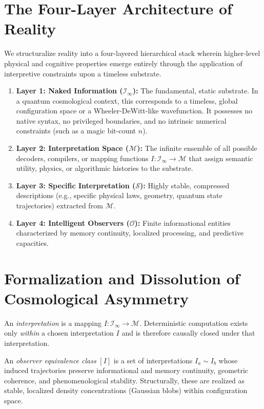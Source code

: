 \documentclass[11pt]{article}
\begin{document}
\section{The Four-Layer Architecture of Reality}
We structuralize reality into a four-layered hierarchical stack wherein higher-level physical and cognitive properties emerge entirely through the application of interpretive constraints upon a timeless substrate.

\begin{enumerate}
    \item \textbf{Layer 1: Naked Information ($\mathcal{I}_\infty$):} The fundamental, static substrate. In a quantum cosmological context, this corresponds to a timeless, global configuration space or a Wheeler-DeWitt-like wavefunction. It possesses no native syntax, no privileged boundaries, and no intrinsic numerical constraints (such as a magic bit-count $n$).
    \item \textbf{Layer 2: Interpretation Space ($\mathcal{M}$):} The infinite ensemble of all possible decoders, compilers, or mapping functions $I : \mathcal{I}_\infty \to \mathcal{M}$ that assign semantic utility, physics, or algorithmic histories to the substrate.
    \item \textbf{Layer 3: Specific Interpretation ($\mathcal{S}$):} Highly stable, compressed descriptions (e.g., specific physical laws, geometry, quantum state trajectories) extracted from $\mathcal{M}$.
    \item \textbf{Layer 4: Intelligent Observers ($\mathcal{O}$):} Finite informational entities characterized by memory continuity, localized processing, and predictive capacities.
\end{enumerate}

\section{Formalization and Dissolution of Cosmological Asymmetry}

\begin{definition}
An \emph{interpretation} is a mapping $I : \mathcal{I}_\infty \to \mathcal{M}$. Deterministic computation exists only \emph{within} a chosen interpretation $I$ and is therefore causally closed under that interpretation.
\end{definition}

\begin{definition}
An \emph{observer equivalence class} $[I]$ is a set of interpretations $I_a \sim I_b$ whose induced trajectories preserve informational and memory continuity, geometric coherence, and phenomenological stability. Structurally, these are realized as stable, localized density concentrations (Gaussian blobs) within configuration space.
\end{definition}
\end{document}
